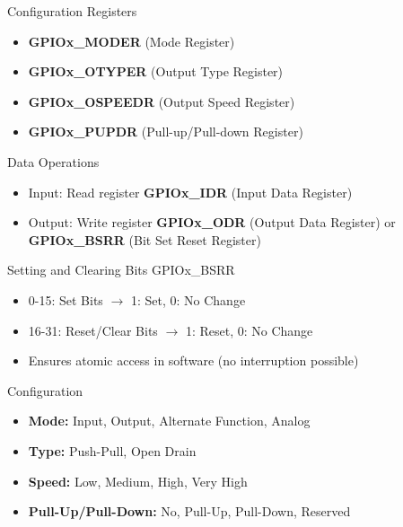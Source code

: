 \begin{theorem}{Configuration Registers}
    \begin{itemize}
        \item \textbf{GPIOx\_MODER} (Mode Register)
        \item \textbf{GPIOx\_OTYPER} (Output Type Register)
        \item \textbf{GPIOx\_OSPEEDR} (Output Speed Register)
        \item \textbf{GPIOx\_PUPDR} (Pull-up/Pull-down Register)
    \end{itemize}
\end{theorem}

\begin{corollary}{Data Operations}
    \begin{itemize}
        \item Input: Read register \textbf{GPIOx\_IDR} (Input Data Register)
        \item Output: Write register \textbf{GPIOx\_ODR} (Output Data Register) or \textbf{GPIOx\_BSRR} (Bit Set Reset Register)
    \end{itemize}
\end{corollary}

\begin{KR}{Setting and Clearing Bits} GPIOx\_BSRR
    \begin{itemize}
        \item 0-15: Set Bits $\rightarrow$ 1: Set, 0: No Change
        \item 16-31: Reset/Clear Bits $\rightarrow$ 1: Reset, 0: No Change
        \item Ensures atomic access in software (no interruption possible)
    \end{itemize}
\end{KR}

\begin{definition}{Configuration}
    \begin{itemize}
        \item \textbf{Mode:} Input, Output, Alternate Function, Analog
        \item \textbf{Type:} Push-Pull, Open Drain
        \item \textbf{Speed:} Low, Medium, High, Very High
        \item \textbf{Pull-Up/Pull-Down:} No, Pull-Up, Pull-Down, Reserved
    \end{itemize}
\end{definition}

